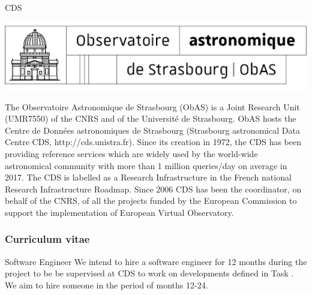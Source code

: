 \begin{sitedescription}{CDS}

\begin{center}
\includegraphics[height=3cm]{Participants/Logos/OAS.png}
\end{center}

The Observatoire Astronomique de Strasbourg (ObAS) is a Joint Research Unit
(UMR7550) of the CNRS and of the Université de Strasbourg. ObAS hosts the 
Centre de Données astronomiques de Strasbourg (Strasbourg astronomical Data 
Centre CDS, http://cds.unistra.fr). Since its creation in 1972, the CDS has 
been providing reference services which are widely used by the world-wide 
astronomical community with more than 1 million queries/day on average in 
2017. The CDS is labelled as a Research Infrastructure in the French national
Research Infrastructure Roadmap. Since 2006 CDS has been the coordinator,
on behalf of the CNRS, of all the projects funded by the European Commission
to support the implementation of European Virtual Observatory. 

%

\subsubsection*{Curriculum vitae}


%
%





\begin{participant}[type=R,PM=12,salary=4200]{Software Engineer}
    We intend to hire a software engineer for 12 months during the project to be be supervised at CDS to work on developments defined in Task . We aim to hire someone in the period of months 12-24. 
\end{participant}


\end{sitedescription}

